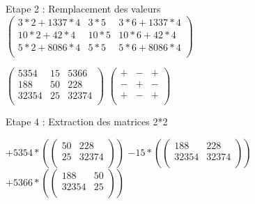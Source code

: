 \vspace{5mm} %

Etape 2 : Remplacement des valeurs \\

\vspace{5mm} %
$
\begin{pmatrix}
  3*2+1337*4 & 3*5  & 3*6+1337*4  \\
  10*2+42*4  & 10*5 & 10*6+42*4   \\
  5*2+8086*4 &  5*5  & 5*6+8086*4 \\
\end{pmatrix}
$

\vspace{5mm} %

$
\begin{pmatrix}
  5354 & 15 & 5366   \\
  188 &  50 & 228    \\
  32354 & 25 & 32374 \\
\end{pmatrix}
$
\vspace{5mm} %
$
\begin{pmatrix}
  + & - & + \\
  - & + & - \\
  + & - & + \\
\end{pmatrix}
$
\vspace{5mm} %

Etape 4 :  Extraction des matrices 2*2 \\

\vspace{5mm} %

$
+5354 *(
\begin{pmatrix}
  50 & 228  \\
  25 & 32374  \\
\end{pmatrix}
)
$
$
-15 *(
\begin{pmatrix}
  188 & 228  \\
  32354 & 32374  \\
\end{pmatrix}
)
$
$
+5366 *(
\begin{pmatrix}
  188 & 50  \\
  32354 & 25  \\
\end{pmatrix}
)
$

\vspace{5mm} %

